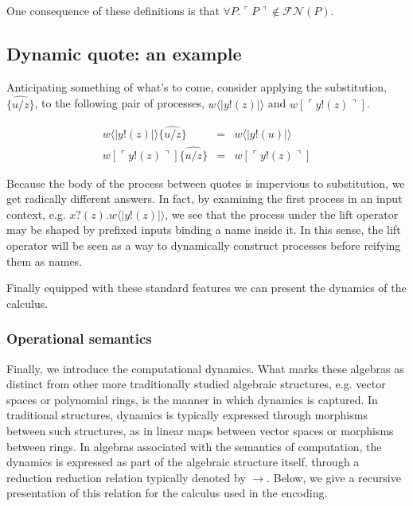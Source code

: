 \documentclass{llncs}
\newcommand{\lliftb}{\langle\!|}
\newcommand{\rliftb}{|\!\rangle}
\newcommand{\lpquote}{\ulcorner}
\newcommand{\rpquote}{\urcorner}
\newcommand{\id}[1]{\texttt{#1}}
\newcommand{\freenames}[1]{\mathbin{\mathcal{FN}(#1)}}
\newcommand{\lift}[2]{#1 \lliftb #2 \rliftb}
\newcommand{\quotep}[1]{\lpquote #1 \rpquote}
\newcommand{\red}{\rightarrow}
\begin{document}
\begin{remark}\label{rem:no_self_referential_names}
  One consequence of these definitions is that $\forall P. \quotep{P}
  \not\in \freenames{P}$.
\end{remark}

\subsection{ Dynamic quote: an example }

Anticipating something of what's to come, consider applying the
substitution, $\widehat{\id{\{}u / z \id{\}}}$, to the following pair
of processes, $\lift{w}{y!(z)}$ and $w[ \lpquote y!(z) \rpquote ]$.

\begin{eqnarray}
	\lift{w}{y!(z)}\widehat{\id{\{}u / z \id{\}}}
		& = &
		\lift{w}{y!(u)} \nonumber\\
	w[ \lpquote y!(z) \rpquote ] \widehat{ \id{\{}u / z \id{\}} }
		& = &
		w[ \lpquote y!(z) \rpquote ] \nonumber
\end{eqnarray}

Because the body of the process between quotes is impervious to
substitution, we get radically different answers. In fact, by
examining the first process in an input context,
e.g. $x?(z).\lift{w}{y!(z)}$, we see that the process under the lift
operator may be shaped by prefixed inputs binding a name inside it. In
this sense, the lift operator will be seen as a way to dynamically
construct processes before reifying them as names.

Finally equipped with these standard features we can present the
dynamics of the calculus.

\subsubsection{Operational semantics} 

Finally, we introduce the computational dynamics. What marks these
algebras as distinct from other more traditionally studied algebraic
structures, e.g. vector spaces or polynomial rings, is the manner in
which dynamics is captured. In traditional structures, dynamics is typically
expressed through morphisms between such structures, as in linear maps
between vector spaces or morphisms between rings. In algebras
associated with the semantics of computation, the dynamics is
expressed as part of the algebraic structure itself, through a
reduction reduction relation typically denoted by $\red$. Below, we
give a recursive presentation of this relation for the calculus used
in the encoding.
\end{document}
